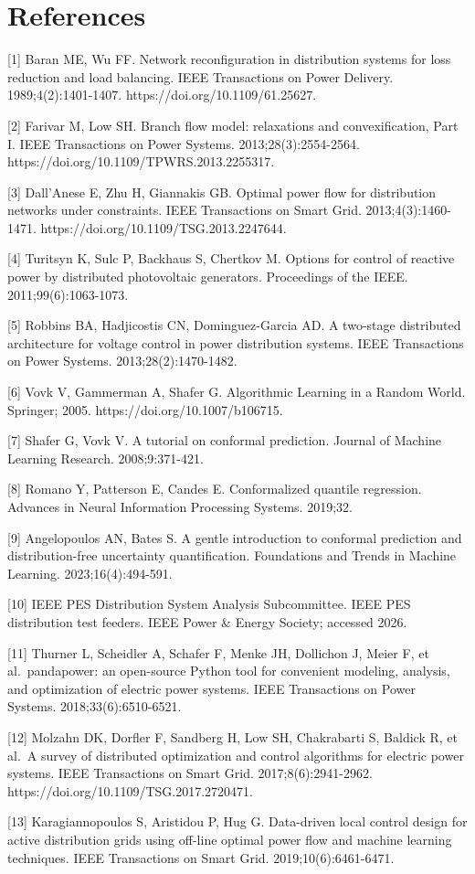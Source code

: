 \documentclass[
  journal]{IEEEtran}
\begin{document}
\section*{References}\label{references}

{[}1{]} Baran ME, Wu FF. Network reconfiguration in distribution systems
for loss reduction and load balancing. IEEE Transactions on Power
Delivery. 1989;4(2):1401-1407. https://doi.org/10.1109/61.25627.

{[}2{]} Farivar M, Low SH. Branch flow model: relaxations and
convexification, Part I. IEEE Transactions on Power Systems.
2013;28(3):2554-2564. https://doi.org/10.1109/TPWRS.2013.2255317.

{[}3{]} Dall'Anese E, Zhu H, Giannakis GB. Optimal power flow for
distribution networks under constraints. IEEE Transactions on Smart
Grid. 2013;4(3):1460-1471. https://doi.org/10.1109/TSG.2013.2247644.

{[}4{]} Turitsyn K, Sulc P, Backhaus S, Chertkov M. Options for control
of reactive power by distributed photovoltaic generators. Proceedings of
the IEEE. 2011;99(6):1063-1073.

{[}5{]} Robbins BA, Hadjicostis CN, Dominguez-Garcia AD. A two-stage
distributed architecture for voltage control in power distribution
systems. IEEE Transactions on Power Systems. 2013;28(2):1470-1482.

{[}6{]} Vovk V, Gammerman A, Shafer G. Algorithmic Learning in a Random
World. Springer; 2005. https://doi.org/10.1007/b106715.

{[}7{]} Shafer G, Vovk V. A tutorial on conformal prediction. Journal of
Machine Learning Research. 2008;9:371-421.

{[}8{]} Romano Y, Patterson E, Candes E. Conformalized quantile
regression. Advances in Neural Information Processing Systems. 2019;32.

{[}9{]} Angelopoulos AN, Bates S. A gentle introduction to conformal
prediction and distribution-free uncertainty quantification. Foundations
and Trends in Machine Learning. 2023;16(4):494-591.

{[}10{]} IEEE PES Distribution System Analysis Subcommittee. IEEE PES
distribution test feeders. IEEE Power \& Energy Society; accessed 2026.

{[}11{]} Thurner L, Scheidler A, Schafer F, Menke JH, Dollichon J, Meier
F, et al.~pandapower: an open-source Python tool for convenient
modeling, analysis, and optimization of electric power systems. IEEE
Transactions on Power Systems. 2018;33(6):6510-6521.

{[}12{]} Molzahn DK, Dorfler F, Sandberg H, Low SH, Chakrabarti S,
Baldick R, et al.~A survey of distributed optimization and control
algorithms for electric power systems. IEEE Transactions on Smart Grid.
2017;8(6):2941-2962. https://doi.org/10.1109/TSG.2017.2720471.

{[}13{]} Karagiannopoulos S, Aristidou P, Hug G. Data-driven local
control design for active distribution grids using off-line optimal
power flow and machine learning techniques. IEEE Transactions on Smart
Grid. 2019;10(6):6461-6471.
\end{document}
